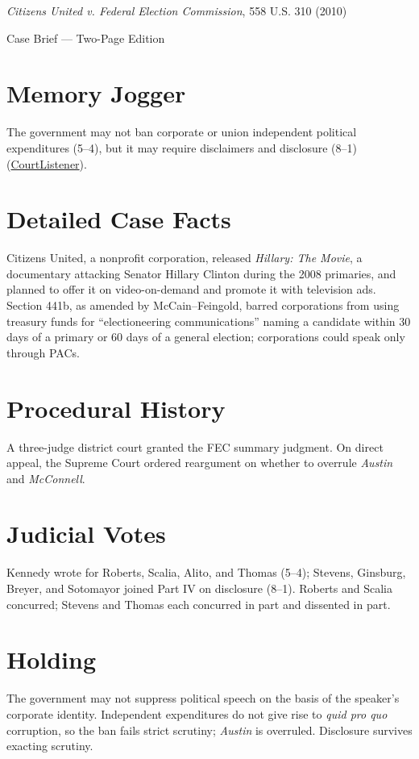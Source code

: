 \documentclass[12pt]{article}
\begin{document}
\begin{center}
{\LARGE \textit{Citizens United v. Federal Election Commission}, 558 U.S. 310 (2010)\par}
\vspace{0.5em}
{\large Case Brief --- Two-Page Edition\par}
\end{center}

\section{Memory Jogger}
The government may not ban corporate or union independent political expenditures (5--4), but it may require disclaimers and disclosure (8--1) (\href{https://www.courtlistener.com/opinion/1741/citizens-united-v-federal-election-commission/}{CourtListener}).

\section{Detailed Case Facts}
Citizens United, a nonprofit corporation, released \textit{Hillary: The Movie}, a documentary attacking Senator Hillary Clinton during the 2008 primaries, and planned to offer it on video-on-demand and promote it with television ads. Section 441b, as amended by McCain--Feingold, barred corporations from using treasury funds for ``electioneering communications'' naming a candidate within 30 days of a primary or 60 days of a general election; corporations could speak only through PACs.

\section{Procedural History}
A three-judge district court granted the FEC summary judgment. On direct appeal, the Supreme Court ordered reargument on whether to overrule \textit{Austin} and \textit{McConnell}.

\section{Judicial Votes}
Kennedy wrote for Roberts, Scalia, Alito, and Thomas (5--4); Stevens, Ginsburg, Breyer, and Sotomayor joined Part IV on disclosure (8--1). Roberts and Scalia concurred; Stevens and Thomas each concurred in part and dissented in part.

\section{Holding}
The government may not suppress political speech on the basis of the speaker's corporate identity. Independent expenditures do not give rise to \textit{quid pro quo} corruption, so the ban fails strict scrutiny; \textit{Austin} is overruled. Disclosure survives exacting scrutiny.
\end{document}
